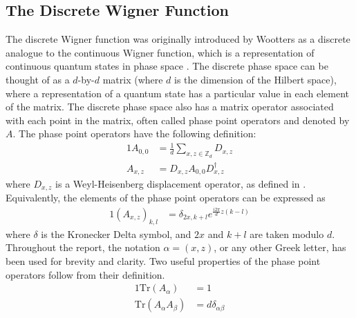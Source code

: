 \documentclass[../3Wworkreport.tex]{subfiles}
\begin{document}
\newpage
\subsection{The Discrete Wigner Function}
\label{app:dwf}

The discrete Wigner function was originally introduced by Wootters as a discrete analogue to the continuous Wigner function, which is a representation of continuous quantum states in phase space \parencite{Wootters1987}. The discrete phase space can be thought of as a $d$-by-$d$ matrix (where $d$ is the dimension of the Hilbert space), where a representation of a quantum state has a particular value in each element of the matrix. The discrete phase space also has a matrix operator associated with each point in the matrix, often called phase point operators and denoted by $A$. The phase point operators have the following definition:
\begin{alignat}{1}
	A_{0,0} &= \frac{1}{d} \sum\limits_{x,z\in\mathbb{Z}_d} D_{x,z}\\
	A_{x,z} &= D_{x,z}A_{0,0}D_{x,z}^\dag
\end{alignat}
where $D_{x,z}$ is a Weyl-Heisenberg displacement operator, as defined in . Equivalently, the elements of the phase point operators can be expressed as
\begin{alignat}{1}
	(A_{x,z})_{k,l} &= \delta_{2x,k+l}e^{\frac{i2\pi}{d}z(k-l)}
\end{alignat}
where $\delta$ is the Kronecker Delta symbol, and $2x$ and $k+l$ are taken modulo $d$. Throughout the report, the notation $\alpha = (x,z)$, or any other Greek letter, has been used for brevity and clarity. Two useful properties of the phase point operators follow from their definition.
\begin{alignat}{1}
	\text{Tr}(A_\alpha) &= 1\\
	\text{Tr}(A_\alpha A_\beta) &= d \delta_{\alpha\beta}
\end{alignat}
\end{document}
